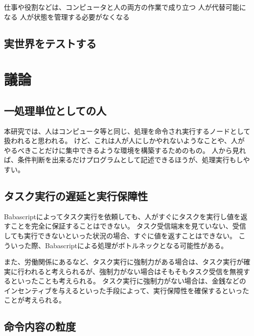 仕事や役割などは、コンピュータと人の両方の作業で成り立つ
人が代替可能になる 人が状態を管理する必要がなくなる

\subsection{実世界をテストする}\label{ux5b9fux4e16ux754cux3092ux30c6ux30b9ux30c8ux3059ux308b}

\section{議論}\label{ux8b70ux8ad6}

\subsection{一処理単位としての人}\label{ux4e00ux51e6ux7406ux5358ux4f4dux3068ux3057ux3066ux306eux4eba}

本研究では、人はコンピュータ等と同じ、処理を命令され実行するノードとして扱われると思われる。
けど、これは人が人にしかやれないようなことや、人がやるべきことだけに集中できるような環境を構築するためのもの。
人から見れば、条件判断を出来るだけプログラムとして記述できるほうが、処理実行もしやすい。

\subsection{タスク実行の遅延と実行保障性}\label{ux30bfux30b9ux30afux5b9fux884cux306eux9045ux5ef6ux3068ux5b9fux884cux4fddux969cux6027}

Babascriptによってタスク実行を依頼しても、人がすぐにタスクを実行し値を返すことを完全に保証することはできない。
タスク受信端末を見ていない、受信しても実行できないといった状況の場合、すぐに値を返すことはできない。
こういった際、Babascriptによる処理がボトルネックとなる可能性がある。

また、労働関係にあるなど、タスク実行に強制力がある場合は、タスク実行が確実に行われると考えられるが、強制力がない場合はそもそもタスク受信を無視するといったことも考えられる。
タスク実行に強制力がない場合は、金銭などのインセンティブを与えるといった手段によって、実行保障性を確保するといったことが考えられる。

\subsection{命令内容の粒度}\label{ux547dux4ee4ux5185ux5bb9ux306eux7c92ux5ea6}

